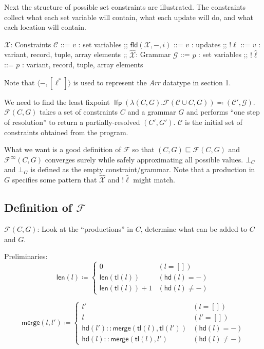 \documentclass[a4paper]{article}
\begin{document}
Next the structure of possible set constraints are illustrated. The constraints collect what each set variable will contain, what each update will do, and what each location will contain.
\RenewDocumentCommand\SimpleBNFDefEq{}{\ensuremath{\supseteq}}
\begin{bnfgrammar}[rrcll]
  $\mathcal{X}$: Constraints $\mathcal{C}$ ::= $v$ : set variables
;;
  $\mathsf{fld}(\mathcal{X}, -, i)$ ::= $v$ : updates
;;
  $!\ell$ ::= $v$ : variant, record, tuple, array elements
;;
  $\mathcal{\hat X}$: Grammar $\mathcal{G}$ ::= $p$ : set variables
;;
  $!\hat\ell$ ::= $p$ : variant, record, tuple, array elements
\end{bnfgrammar}
\RenewDocumentCommand{}

Note that $\langle -,[\ell^*]\rangle$ is used to represent the \textit{Arr} datatype in section 1.

We need to find the least fixpoint $\operatorname{\mathsf{lfp}}(\lambda (C,G).\mathcal{F}(\mathcal{C}\cup C,G)) \eqcolon (\mathcal{C'},\mathcal G)$. $\mathcal{F}(C,G)$ takes a set of constraints $C$ and a grammar $G$ and performs ``one step of resolution'' to return a partially-resolved $(C',G')$. $\mathcal{C}$ is the initial set of constraints obtained from the program.

What we want is a good definition of $\mathcal{F}$ so that $(C,G)\sqsubseteq\mathcal{F}(C,G)$ and $\mathcal{F}^\infty(C,G)$ converges surely while safely approximating all possible values. $\bot_C$ and $\bot_G$ is defined as the empty constraint/grammar. Note that a production in $G$ specifies some pattern that $\hat {\mathcal{X}}$ and $!\hat\ell$ might match.

\subsection{Definition of $\mathcal{F}$}
$\mathcal{F}(C,G)$: Look at the ``productions'' in $C$, determine what can be added to $C$ and $G$.

Preliminaries:
$$\mathsf{len}(l)\coloneq\begin{cases}
0 & (l=[])\\
\mathsf{len}(\mathsf{tl}(l)) & (\mathsf{hd}(l)=-)\\
\mathsf{len}(\mathsf{tl}(l)) + 1 & (\mathsf{hd}(l)\neq-)
\end{cases}$$

$$\mathsf{merge}(l,l')\coloneq\begin{cases}
l' & (l=[])\\
l & (l'=[])\\
\mathsf{hd}(l')::\mathsf{merge}(\mathsf{tl}(l),\mathsf{tl}(l')) & (\mathsf{hd}(l)=-)\\
\mathsf{hd}(l)::\mathsf{merge}(\mathsf{tl}(l),l') & (\mathsf{hd}(l)\neq-)
\end{cases}$$
\end{document}
